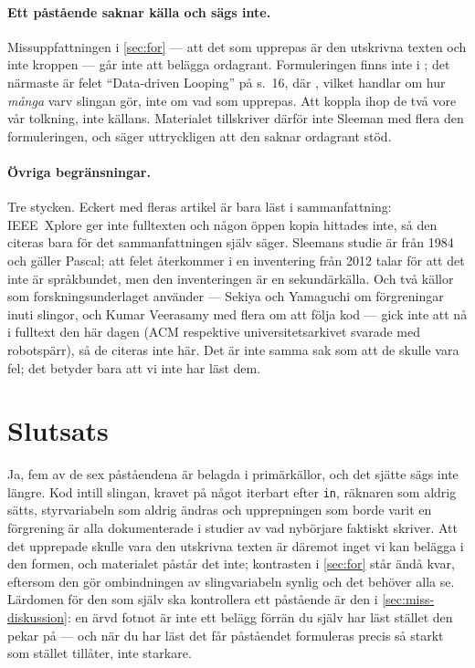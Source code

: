 \paragraph{Ett påstående saknar källa och sägs inte.}  Missuppfattningen i
\cref{sec:for} --- att det som upprepas är den utskrivna texten och inte
kroppen --- går inte att belägga ordagrant.  Formuleringen finns inte i
\textcite{Sleeman1984}; det närmaste är felet \enquote{Data-driven Looping}
på s.~16, där ,
vilket handlar om hur \emph{många} varv slingan gör, inte om vad som
upprepas.  Att koppla ihop de två vore vår tolkning, inte källans.
Materialet tillskriver därför inte Sleeman med flera den formuleringen, och
säger uttryckligen att den saknar ordagrant stöd.

\paragraph{Övriga begränsningar.}  Tre stycken.  Eckert med fleras artikel
är bara läst i sammanfattning: IEEE\ Xplore ger inte fulltexten och någon
öppen kopia hittades inte, så den citeras bara för det sammanfattningen
själv säger.  Sleemans studie är från 1984 och gäller Pascal; att felet
återkommer i en inventering från 2012 talar för att det inte är språkbundet,
men den inventeringen är en sekundärkälla.  Och två källor som
forskningsunderlaget använder --- Sekiya och Yamaguchi om förgreningar inuti
slingor, och Kumar Veerasamy med flera om att följa kod --- gick inte att nå
i fulltext den här dagen (ACM respektive universitetsarkivet svarade med
robotspärr), så de citeras inte här.  Det är inte samma sak som att de
skulle vara fel; det betyder bara att vi inte har läst dem.

\section{Slutsats}
\label{sec:miss-slutsats}

Ja, fem av de sex påståendena är belagda i primärkällor, och det sjätte
sägs inte längre.  Kod intill slingan, kravet på något iterbart efter
\texttt{in}, räknaren som aldrig sätts, styrvariabeln som aldrig
ändras och upprepningen som borde varit en förgrening är alla dokumenterade
i studier av vad nybörjare faktiskt skriver.  Att det upprepade skulle vara
den utskrivna texten är däremot inget vi kan belägga i den formen, och
materialet påstår det inte; kontrasten i \cref{sec:for} står ändå kvar,
eftersom den gör ombindningen av slingvariabeln synlig och det behöver alla
se.  Lärdomen för den som själv ska kontrollera ett påstående är den i
\cref{sec:miss-diskussion}: en ärvd fotnot är inte ett belägg förrän du
själv har läst stället den pekar på --- och när du har läst det får
påståendet formuleras precis så starkt som stället tillåter, inte starkare.

